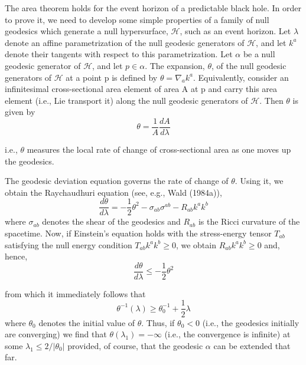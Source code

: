 \documentclass[11pt,a4paper]{article}
\begin{document}
The area theorem holds for the event horizon of a predictable black hole. In order to prove it, we need to develop some simple properties of a family of null geodesics which generate a null hypersurface, \(\mathcal{H}\), such as an event horizon. Let \(\lambda\) denote an affine parametrization of the null geodesic generators of \(\mathcal{H}\), and let \(k^a\) denote their tangents with respect to this parametrization. Let \(\alpha\) be a null geodesic generator of \(\mathcal{H}\), and let \(p\in\alpha\). The expansion, \(\theta\), of the null geodesic generators of \(\mathcal{H}\) at a point p is defined by \(\theta = \nabla_a k^a\). Equivalently, consider an infinitesimal cross-sectional area element of area A at p and carry this area element (i.e., Lie transport it) along the null geodesic generators of \(\mathcal{H}\). Then \(\theta\) is given by
\begin{equation*}
\theta = \frac{1}{A} \frac{dA}{d\lambda} \tag{6.1.2}\label{eq:6.1.2}
\end{equation*}

i.e., \(\theta\) measures the local rate of change of cross-sectional area as one moves up the geodesics.

\hypertarget{source-151}{}

The geodesic deviation equation governs the rate of change of \(\theta\). Using it, we obtain the Raychaudhuri equation (see, e.g., Wald (1984a)),
\begin{equation*}
\frac{d\theta}{d\lambda} = -\frac{1}{2} \theta^2 - \sigma_{ab} \sigma^{ab} - R_{ab} k^a k^b \tag{6.1.3}\label{eq:6.1.3}
\end{equation*}
where \(\sigma_{ab}\) denotes the shear of the geodesics and \(R_{ab}\) is the Ricci curvature of the spacetime. Now, if Einstein's equation holds with the stress-energy tensor \(T_{ab}\) satisfying the null energy condition \(T_{ab}k^ak^b\geq0\), we obtain \(R_{ab}k^ak^b\geq0\) and, hence,
\begin{equation*}
\frac{d\theta}{d\lambda} \le -\frac{1}{2} \theta^2 \tag{6.1.4}\label{eq:6.1.4}
\end{equation*}

from which it immediately follows that
\begin{equation*}
\theta^{-1}(\lambda) \ge \theta_0^{-1} + \frac{1}{2}\lambda \tag{6.1.5}\label{eq:6.1.5}
\end{equation*}
where \(\theta_0\) denotes the initial value of \(\theta.\) Thus, if \(\theta_0<0\) (i.e., the geodesics initially are converging) we find that \(\theta(\lambda_1)=-\infty\) (i.e., the convergence is infinite) at some \(\lambda_1\leq 2/|\theta_0|\) provided, of course, that the geodesic \(\alpha\) can be extended that far.
\end{document}
